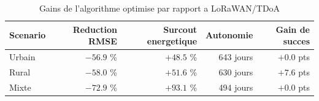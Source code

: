 \begin{table}[H]
\centering
\caption{Gains de l'algorithme optimise par rapport a LoRaWAN/TDoA}
\label{tab:gains_optimise}
\begin{tabular}{|l|r|r|r|r|}
\hline
\rowcolor{myColor!20}
\textbf{Scenario} & \textbf{Reduction RMSE} & \textbf{Surcout energetique} & \textbf{Autonomie} & \textbf{Gain de succes} \\
\hline
Urbain & $-56.9$ \% & $+48.5$ \% & 643 jours & $+0.0$ pts \\ \hline
Rural & $-58.0$ \% & $+51.6$ \% & 630 jours & $+7.6$ pts \\ \hline
Mixte & $-72.9$ \% & $+93.1$ \% & 494 jours & $+0.0$ pts \\ \hline
\end{tabular}
\end{table}

